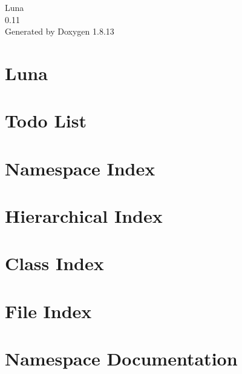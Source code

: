 \documentclass[twoside]{book}
\newcommand{\+}{\discretionary{\mbox{\scriptsize$\hookleftarrow$}}{}{}}
\newcommand{\clearemptydoublepage}{%
  \newpage{\pagestyle{empty}\cleardoublepage}%
}
\begin{document}
\hypersetup{pageanchor=false,
             bookmarksnumbered=true,
             pdfencoding=unicode
            }
\begin{titlepage}
\vspace*{7cm}
\begin{center}%
{\Large Luna \\[1ex]\large 0.\+11 }\\
\vspace*{1cm}
{\large Generated by Doxygen 1.8.13}\\
\end{center}
\end{titlepage}
\clearemptydoublepage
{}
\tableofcontents
\clearemptydoublepage
{}
\hypersetup{pageanchor=true}

\chapter{Luna}
\label{md_README}

\chapter{Todo List}
\label{todo}

\chapter{Namespace Index}

\chapter{Hierarchical Index}

\chapter{Class Index}

\chapter{File Index}

\chapter{Namespace Documentation}




\end{document}
